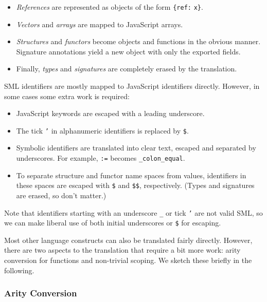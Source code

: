 \documentclass[twoside,titlepage]{article}
\begin{document}
\begin{itemize}
\item {\em References} are represented as objects of the form {\tt \{ref:} {\tt x\}}.

\item {\em Vectors} and {\em arrays} are mapped to JavaScript arrays.

\item {\em Structures} and {\em functors} become objects and functions in the obvious manner. Signature annotations yield a new object with only the exported fields.

\item Finally, {\em types} and {\em signatures} are completely erased by the translation.

\end{itemize}

SML identifiers are mostly mapped to JavaScript identifiers directly. However, in some cases some extra work is required:

\begin{itemize}
\setlength{\parskip}{0ex}

\item JavaScript keywords are escaped with a leading underscore.

\item The tick {\tt '} in alphanumeric identifiers is replaced by {\tt \$}.

\item Symbolic identifiers are translated into clear text, escaped and separated by underscores. For example, {\tt :=} becomes {\tt \_colon\_equal}.

\item To separate structure and functor name spaces from values, identifiers in these spaces are escaped with {\tt \$} and {\tt \$\$}, respectively. (Types and signatures are erased, so don't matter.)

\end{itemize}

Note that identifiers starting with an underscore {\tt \_} or tick {\tt '} are not valid SML, so we can make liberal use of both initial underscores or {\tt \$} for escaping.

Most other language constructs can also be translated fairly directly.
However, there are two aspects to the translation that require a bit more work: arity conversion for functions and non-trivial scoping. We sketch these briefly in the following.


\subsubsection*{Arity Conversion}
\end{document}

